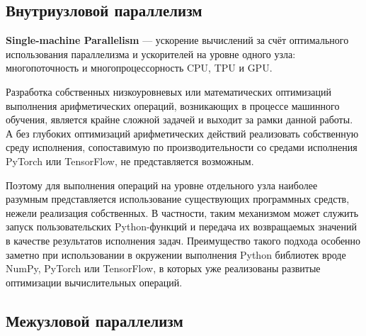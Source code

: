 \documentclass[a4paper,12pt]{extarticle}
\begin{document}
\subsection{Внутриузловой параллелизм}

    \textbf{Single-machine Parallelism} — ускорение вычислений за счёт оптимального использования параллелизма и ускорителей на уровне одного узла: многопоточность и многопроцессорность CPU, TPU и GPU.

    Разработка собственных низкоуровневых или математических оптимизаций выполнения арифметических операций, возникающих в процессе машинного обучения, является крайне сложной задачей и выходит за рамки данной работы.
    А без глубоких оптимизаций арифметических действий реализовать собственную среду исполнения, сопоставимую по производительности со средами исполнения PyTorch или TensorFlow, не представляется возможным.

    Поэтому для выполнения операций на уровне отдельного узла наиболее разумным представляется использование существующих программных средств, нежели реализация собственных.
    В частности, таким механизмом может служить запуск пользовательских Python-функций и передача их возвращаемых значений в качестве результатов исполнения задач.
    Преимущество такого подхода особенно заметно при использовании в окружении выполнения Python библиотек вроде NumPy, PyTorch или TensorFlow, в которых уже реализованы развитые оптимизации вычислительных операций.

\subsection{Межузловой параллелизм}
\end{document}
